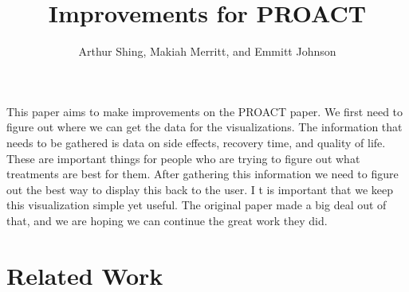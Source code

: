 \documentclass[journal]{vgtc}                %
\title{Improvements for PROACT}
\author{Arthur Shing, Makiah Merritt, and Emmitt Johnson}
\begin{document}


\maketitle

        This paper aims to make improvements on the PROACT paper.
        We first need to figure out where we can get the data for the visualizations.
        The information that needs to be gathered is data on side effects, recovery time, and quality of life.
        These are important things for people who are trying to figure out what treatments are best for them.
        After gathering this information we need to figure out the best way to display this back to the user. I
        t is important that we keep this visualization simple yet useful.
        The original paper made a big deal out of that, and we are hoping we can continue the great work they did.


\section{Related Work}
\end{document}

